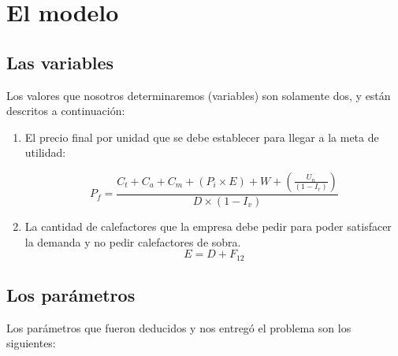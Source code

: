 \documentclass[12pt]{report}
\begin{document}
\section*{El modelo}


\subsection*{Las variables}

Los valores que nosotros determinaremos (variables) son solamente dos, y est\'an descritos a continuaci\'on:

\begin{enumerate}
    \item El precio final por unidad que se debe establecer para llegar a la meta de utilidad:

    $$P_{f} = \frac{C_{t}+C_{a}+C_{m}+(P_{i}\times E)+W+(\frac{U_{n}}{(1-I_{r})})}{D\times (1-I_{v})}$$
    \item La cantidad de calefactores que la empresa debe pedir para poder satisfacer la demanda y no pedir calefactores de sobra.
     $$E = D + F_{12}$$
\end{enumerate}


\subsection*{Los par\'ametros}
Los par\'ametros que fueron deducidos y nos entreg\'o el problema son los siguientes:
\end{document}
